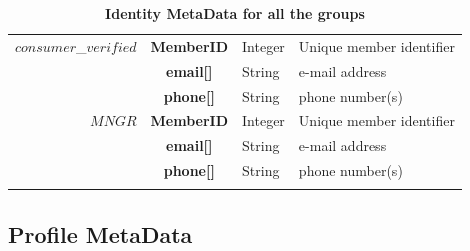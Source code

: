 \begin{table}[H]
\begin{centering}
{\begin{tabular}{ r | c | l | l }
\hline
$consumer$\_$verified$ & {\bf MemberID}		&Integer	& Unique member identifier \\
			& {\bf email[]}				&String	& e-mail address \\
			& {\bf phone[]}				&String	& phone number(s) \\
\hline
$MNGR$ 		& {\bf MemberID}			&Integer	& Unique member identifier \\
			& {\bf email[]}				&String	& e-mail address \\
			& {\bf phone[]}				&String	& phone number(s) \\
\Xhline{1.5pt}
\end{tabular}
}
\caption{\small\textbf{Identity MetaData for all the groups}}
\label{tab:IdentityMetaData}
\end{centering}
\vspace{-1cm}
\end{table}


\subsection{Profile MetaData}

